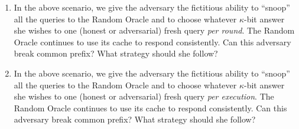 \begin{problems}
\begin{enumerate}
            You do not need to concretely calculate the numerical values.

        \item In the above scenario, we give the adversary the fictitious
            ability to ``snoop'' all the queries to the Random Oracle and to choose
            whatever $\kappa$-bit answer she wishes to one (honest or adversarial) fresh
            query \emph{per round}. The Random Oracle continues to use its cache to
            respond consistently. Can this adversary break common prefix? What strategy
            should she follow?

        \item In the above scenario, we give the adversary the
            fictitious ability to ``snoop'' all the queries to the Random Oracle and to
            choose whatever $\kappa$-bit answer she wishes to one (honest or
            adversarial) fresh query \emph{per execution}. The Random Oracle continues
            to use its cache to respond consistently. Can this adversary break common
            prefix? What strategy should she follow?
        \end{enumerate}

\end{problems}
